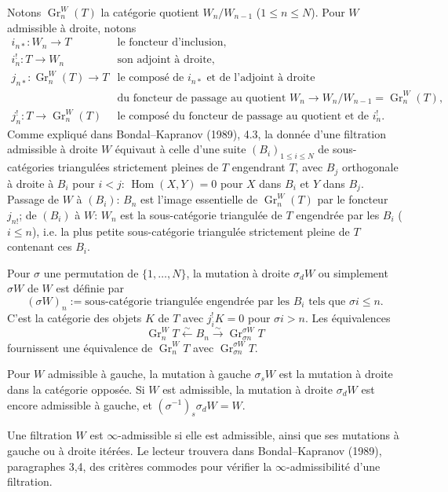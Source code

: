 \documentclass[11pt]{article}
\newcommand{\Hom}{\operatorname{Hom}}
\newcommand{\Gr}{\operatorname{Gr}}
\begin{document}
Notons $\Gr^W_n(T)$ la catégorie quotient $W_n/W_{n-1}$ ($1\leq n\leq N$). Pour $W$ admissible à droite, notons
\[
\begin{array}{ll}
 i_{n*}:W_n\to T & \text{le foncteur d'inclusion},\\
 i_n^!:T\to W_n & \text{son adjoint à droite},\\
 j_{n*}:\Gr^W_n(T)\to T & \text{le composé de }i_{n*}\text{ et de l'adjoint à droite}\\
 & \text{du foncteur de passage au quotient }W_n\to W_n/W_{n-1}=\Gr^W_n(T),\\
 j_n^!:T\to\Gr^W_n(T) & \text{le composé du foncteur de passage au quotient et de }i_n^!.
\end{array}
\]
Comme expliqué dans Bondal--Kapranov (1989), 4.3, la donnée d'une filtration admissible à droite $W$ équivaut à celle d'une suite $(B_i)_{1\leq i\leq N}$ de sous-catégories triangulées strictement pleines de $T$ engendrant $T$, avec $B_j$ orthogonale à droite à $B_i$ pour $i<j$: $\Hom(X,Y)=0$ pour $X$ dans $B_i$ et $Y$ dans $B_j$. Passage de $W$ à $(B_i)$: $B_n$ est l'image essentielle de $\Gr^W_n(T)$ par le foncteur $j_{n!}$; de $(B_i)$ à $W$: $W_n$ est la sous-catégorie triangulée de $T$ engendrée par les $B_i$ ($i\leq n$), i.e. la plus petite sous-catégorie triangulée strictement pleine de $T$ contenant ces $B_i$.

Pour $\sigma$ une permutation de $\{1,\ldots,N\}$, la mutation à droite $\sigma_dW$ ou simplement $\sigma W$ de $W$ est définie par
\[
 (\sigma W)_n:=\text{sous-catégorie triangulée engendrée par les }B_i\text{ tels que }\sigma i\leq n.
\]
C'est la catégorie des objets $K$ de $T$ avec $j_i^!K=0$ pour $\sigma i>n$. Les équivalences
\begin{equation}
 \Gr^W_n T \xleftarrow{\sim} B_n \xrightarrow{\sim} \Gr^{\sigma W}_{\sigma n}T
\tag{0.2}
\end{equation}
fournissent une équivalence de $\Gr^W_nT$ avec $\Gr^{\sigma W}_{\sigma n}T$.

Pour $W$ admissible à gauche, la mutation à gauche $\sigma_sW$ est la mutation à droite dans la catégorie opposée. Si $W$ est admissible, la mutation à droite $\sigma_dW$ est encore admissible à gauche, et $(\sigma^{-1})_s\sigma_dW=W$.

Une filtration $W$ est $\infty$-admissible si elle est admissible, ainsi que ses mutations à gauche ou à droite itérées. Le lecteur trouvera dans Bondal--Kapranov (1989), paragraphes 3,4, des critères commodes pour vérifier la $\infty$-admissibilité d'une filtration.
\end{document}
